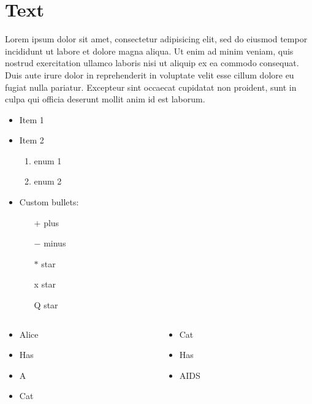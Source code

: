 \section{Text}


{
\begin{multicols}{2}
Lorem ipsum dolor sit amet, consectetur adipisicing elit, sed do eiusmod tempor incididunt ut labore et dolore magna aliqua. Ut enim ad minim veniam, quis nostrud exercitation ullamco laboris nisi ut aliquip ex ea commodo consequat. Duis aute irure dolor in reprehenderit in voluptate velit esse cillum dolore eu fugiat nulla pariatur. Excepteur sint occaecat cupidatat non proident, sunt in culpa qui officia deserunt mollit anim id est laborum.
\end{multicols}
}


{
\begin{itemize}
\item Item 1
\pause

\item Item 2
\begin{enumerate}
\item enum 1
\item enum 2
\end{enumerate}
\pause

\item Custom bullets:
\begin{enumerate}
\item[$+$] plus
\item[$-$] minus
\item[$*$] star
\item[x] star
\item[Q] star
\end{enumerate}
\end{itemize}
}


{
\begin{columns}

\begin{column}{0.45\textwidth}
\begin{itemize}
\item Alice
\item Has
\item A
\item Cat
\end{itemize}
\end{column}

\begin{column}{0.45\textwidth}
\begin{itemize}
\item Cat
\item Has
\item AIDS
\end{itemize}
\end{column}

\end{columns}
}


